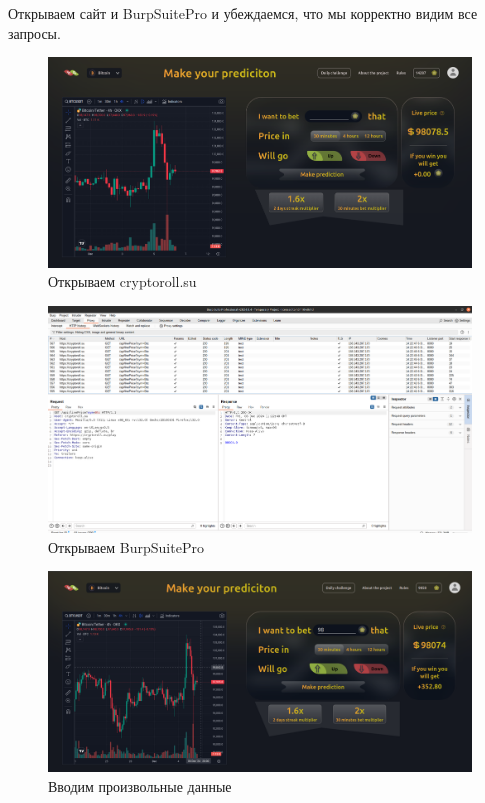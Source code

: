 \documentclass[a4paper, 12pt]{article}
\begin{document}
Открываем сайт и BurpSuitePro и убеждаемся, что мы корректно видим все запросы.

\newpage
\begin{figure}[h!]
    \noindent
    \centering
    \includegraphics[width=1\linewidth]{pic_cryptoroll_1.png}
    \caption{Открываем cryptoroll.su}
\end{figure}

\begin{figure}[h!]
    \noindent
    \centering
    \includegraphics[width=1\linewidth]{pic_burp_1.png}
    \caption{Открываем BurpSuitePro}
\end{figure}

\newpage
\begin{figure}[h!]
    \noindent
    \centering
    \includegraphics[width=1\linewidth]{pic_cryptoroll_2.png}
    \caption{Вводим произвольные данные}
\end{figure}
\end{document}
